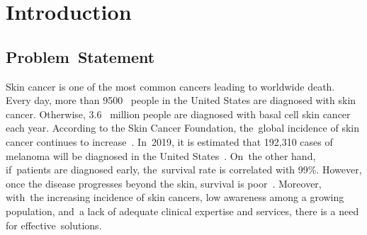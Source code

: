 \documentclass[sensors,article,accept,pdftex,moreauthors]{Definitions/mdpi}
\begin{document}
\setcounter{section}{0} %

\section{Introduction}
\unskip 
\subsection{Problem~Statement}
Skin cancer is one of the most common cancers leading to worldwide death. Every day, more than 9500~ %
 people in the United States are diagnosed with skin cancer. Otherwise, 3.6~\cite{03358} million people are diagnosed with basal cell skin cancer each year. According to the Skin Cancer Foundation, the~global incidence of skin cancer continues to increase~\cite{11872}. In~2019, it is estimated that 192,310 cases of melanoma will be diagnosed in the United States~\cite{11872}. On~the other hand, if~patients are diagnosed early, the~survival rate is correlated with 99\%. However, once the disease progresses beyond the skin, survival is poor~\cite{11872}. Moreover, with~the increasing incidence of skin cancers, low awareness among a growing population, and~a lack of adequate clinical expertise and services, there is a need for effective~solutions. 
\end{document}
